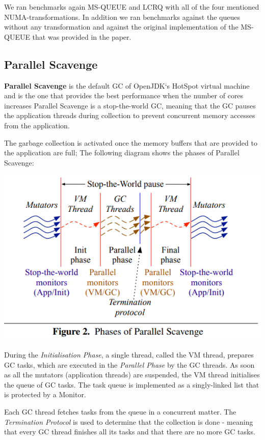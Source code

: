 \documentclass{article}
\begin{document}
 We ran benchmarks again MS-QUEUE and LCRQ with all of the four mentioned NUMA-transformations. In addition we ran benchmarks against the queues without any transformation and against the original implementation of the MS-QUEUE that was provided in the paper.

 \subsection{Parallel Scavenge}
 \textbf{Parallel Scavenge} is the default GC of OpenJDK`s HotSpot virtual machine and is the one that provides the best performance when the number of cores increases\cite{paper}
 Parallel Scavenge is a stop-the-world GC, meaning that the GC pauses the application threads during collection to prevent concurrent memory accesses from the application.

 The garbage collection is activated once the memory buffers that are provided to the application are full; The following diagram shows the phases of Parallel Scavenge:

 \includegraphics[width=\textwidth]{gc_phases.png}

 During the \textit{Initialisation Phase}, a single thread, called the VM thread, prepares GC tasks, which are executed in the \textit{Parallel Phase} by the GC threads.
 As soon as all the mutators (application threads) are suspended, the VM thread initialises the queue of GC tasks. The task queue is implemented as a singly-linked list that is protected by a Monitor.

 Each GC thread fetches tasks from the queue in a concurrent matter. The \textit{Termination Protocol} is used to determine that the collection is done - meaning that every GC thread finishes all its tasks and that there are no more GC tasks. 
 
\end{document}
